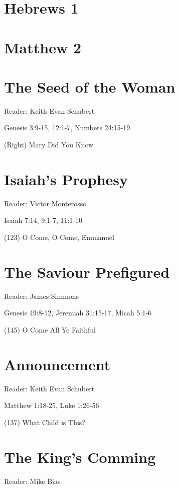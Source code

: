 \documentclass{article}
\begin{document}
\section{Hebrews 1}

\section{Matthew 2}


\pagebreak













\section{The Seed of the Woman}
Reader: Keith Evan Schubert

Genesis 3:9-15, 12:1-7, %
Numbers 24:15-19

(Right) Mary Did You Know


\section{Isaiah's Prophesy}
Reader: Victor Monterosso

Isaiah 7:14, 9:1-7, 11:1-10

(123) O Come, O Come, Emmanuel

\section{The Saviour Prefigured}
Reader: James Simmons

Genesis 49:8-12, Jeremiah 31:15-17, Micah 5:1-6

(145) O Come All Ye Faithful

\section{Announcement}
Reader:  Keith Evan Schubert

Matthew 1:18-25, Luke 1:26-56

(137) What Child is This?

\section{The King's Comming}
Reader: Mike Bias
\end{document}
